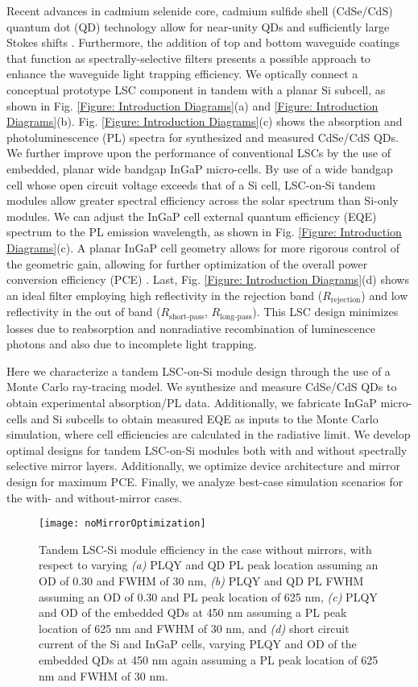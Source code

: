 \documentclass[conference]{./pvsctran}
\begin{document}
		Recent advances in cadmium selenide core, cadmium sulfide shell (CdSe/CdS) quantum dot (QD) technology allow for near-unity QDs and sufficiently large Stokes shifts \cite{Bronstein2014, Meinardi2014}.  Furthermore, the addition of top and bottom waveguide coatings that function as spectrally-selective filters presents a possible approach to enhance the waveguide light trapping efficiency. We optically connect a conceptual prototype LSC component in tandem with a planar Si subcell, as shown in Fig. \ref{Figure: Introduction Diagrams}(a) and \ref{Figure: Introduction Diagrams}(b).  Fig. \ref{Figure: Introduction Diagrams}(c) shows the absorption and photoluminescence (PL) spectra for synthesized and measured CdSe/CdS QDs. We further improve upon the performance of conventional LSCs by the use of embedded, planar wide bandgap InGaP micro-cells. By use of a wide bandgap cell whose open circuit voltage exceeds that of a Si cell, LSC-on-Si tandem modules allow greater spectral efficiency across the solar spectrum than Si-only modules.  We can adjust the InGaP cell external quantum efficiency (EQE) spectrum to the PL emission wavelength, as shown in Fig. \ref{Figure: Introduction Diagrams}(c). A planar InGaP cell geometry allows for more rigorous control of the geometric gain, allowing for further optimization of the overall power conversion efficiency (PCE) \cite{Sahin2011}. Last, Fig. \ref{Figure: Introduction Diagrams}(d) shows an ideal filter employing high reflectivity in the rejection band ($R_\text{rejection}$) and low reflectivity in the out of band ($R_\text{short-pass}$, $R_\text{long-pass}$). This LSC design minimizes losses due to reabsorption and nonradiative recombination of luminescence photons and also due to incomplete light trapping. 
		
		Here we characterize a tandem LSC-on-Si module design through the use of a Monte Carlo ray-tracing model. We synthesize and measure CdSe/CdS QDs to obtain experimental absorption/PL data. Additionally, we fabricate InGaP micro-cells and Si subcells to obtain measured EQE as inputs to the Monte Carlo simulation, where cell efficiencies are calculated in the radiative limit. We develop optimal designs for tandem LSC-on-Si modules both with and without spectrally selective mirror layers. Additionally, we optimize device architecture and mirror design for maximum PCE. Finally, we analyze best-case simulation scenarios for the with- and without-mirror cases. 
		
		
		\begin{figure*}[t]
			\centering
			\texttt{[image: noMirrorOptimization]}
			\caption{Tandem LSC-Si module efficiency in the case without mirrors, with respect to varying \textit{(a)} PLQY and QD PL peak location assuming an OD of 0.30 and FWHM of 30 nm, \textit{(b)} PLQY and QD PL FWHM assuming an OD of 0.30 and PL peak location of 625 nm, \textit{(c)} PLQY and OD of the embedded QDs at 450 nm assuming a PL peak location of 625 nm and FWHM of 30 nm, and \textit{(d)} short circuit current of the Si and InGaP cells, varying PLQY and OD of the embedded QDs at 450 nm again assuming a PL peak location of 625 nm and FWHM of 30 nm.}
			\label{Figure: No Mirror Optimization}
		\end{figure*}
		
\end{document}
